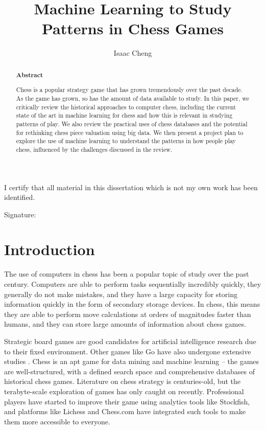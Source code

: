 \documentclass[%
 superscriptaddress,
showpacs,preprintnumbers,
 amsmath,
 amssymb,
 aps,
 pra,
showkeys,
onecolumn,
notitlepage,
11pt,
tightenlines      %
]{revtex4-1}
\begin{document}
\title{\Large Machine Learning to Study Patterns in Chess Games}

\author{Isaac Cheng}

\begin{abstract}
\noindent \textbf{Abstract}

\noindent 
Chess is a popular strategy game that has grown tremendously over the past decade. As the game has grown, so has the amount of data available to study. In this paper, we critically review the historical approaches to computer chess, including the current state of the art in machine learning for chess and how this is relevant in studying patterns of play. We also review the practical uses of chess databases and the potential for rethinking chess piece valuation using big data. We then present a project plan to explore the use of machine learning to understand the patterns in how people play chess, influenced by the challenges discussed in the review.

\end{abstract}

\maketitle

\vspace*{\fill}


\begin{center}
I certify that all material in this dissertation which is not my own work has been identified.
\end{center}
\vspace{1em}

Signature: \hrulefill


\newpage
\section{Introduction}
The use of computers in chess has been a popular topic of study over the past century. Computers are able to perform tasks sequentially incredibly quickly, they generally do not make mistakes, and they have a large capacity for storing information quickly in the form of secondary storage devices. In chess, this means they are able to perform move calculations at orders of magnitudes faster than humans, and they can store large amounts of information about chess games.

Strategic board games are good candidates for artificial intelligence research due to their fixed environment. Other games like Go have also undergone extensive studies \cite{muller2002computer}. Chess is an apt game for data mining and machine learning -- the games are well-structured, with a defined search space and comprehensive databases of historical chess games. Literature on chess strategy is centuries-old, but the terabyte-scale exploration of games has only caught on recently. Professional players have started to improve their game using analytics tools like Stockfish, and platforms like Lichess and Chess.com have integrated such tools to make them more accessible to everyone.
\end{document}
